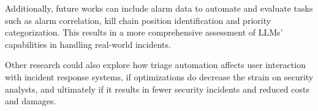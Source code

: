 Additionally, future works can include alarm data to automate and evaluate tasks such as alarm correlation, kill
chain position identification and priority categorization.
This results in a more comprehensive assessment of LLMs' capabilities in handling real-world incidents.

Other research could also explore how triage automation affects user interaction with incident response systems, if
optimizations do decrease the strain on security analysts, and ultimately if it results in fewer security incidents and
reduced costs and damages.